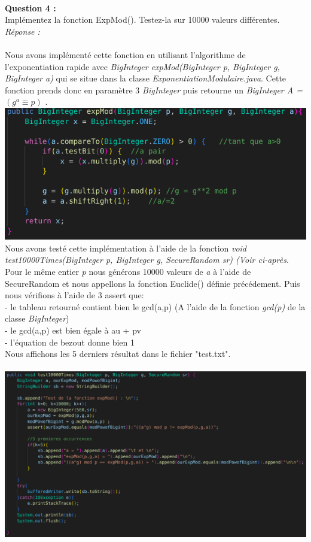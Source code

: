 \documentclass[a4paper,11pt]{article}
\begin{document}
        \textbf{\\Question 4 : \\}Implémentez la fonction ExpMod(). Testez-la sur 10000 valeurs différentes.
        \textit{\\Réponse :} \\\\Nous avons implémenté cette fonction en utilisant l'algorithme de l'exponentiation rapide avec \textit{ BigInteger expMod(BigInteger p, BigInteger g, BigInteger a) } qui se situe dans la classe \textit{ExponentiationModulaire.java}. Cette fonction prends donc en paramètre 3 \textit{BigInteger} puis retourne un  \textit{ BigInteger A = $(g^a \equiv p)$} . \\\includegraphics[scale=0.4]{assets/ExpMod.png}\\Nous avons testé cette implémentation à l'aide de la fonction \textit{ void test10000Times(BigInteger p, BigInteger g, SecureRandom sr) (Voir ci-après}.\\Pour le même entier \textit{p} nous générons 10000 valeurs de \textit{a} à l'aide de SecureRandom et nous appellons la fonction Euclide() définie précédement. Puis nous vérifions à l'aide de 3 assert que:\\ - le tableau retourné contient bien le gcd(a,p) (A l'aide de la fonction \textit{gcd(p)} de la classe \textit{BigInteger})\\ - le gcd(a,p) est bien égale à au + pv\\ - l'équation de bezout donne bien 1\\ Nous affichons les 5 derniers résultat dans le fichier "test.txt". \\\\\includegraphics[scale=0.3]{assets/testExpMod.png}
\end{document}
